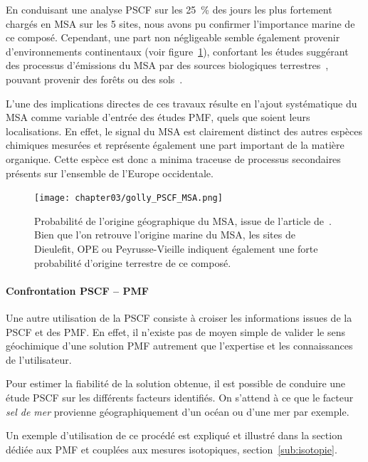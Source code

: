 En conduisant une analyse PSCF sur les \SI{25}{\percent} des jours les plus fortement chargés en MSA
sur les 5 sites, nous avons pu confirmer l'importance marine de ce composé. 
Cependant, une part non négligeable semble également provenir d'environnements
continentaux (voir
figure~\ref{fig:chapter03/golly_PSCF_MSA}), confortant les études suggérant des processus
d'émissions du MSA par des sources biologiques terrestres~\autocite{bozzettiArgon2017},
pouvant provenir des forêts ou des
sols~\autocite{jardineDimethyl2015,miyazakiSeasonal2012}.

L'une des implications directes de ces travaux résulte en l'ajout systématique du MSA
comme variable d'entrée des études PMF, quels que soient leurs localisations. En effet, le
signal du MSA est clairement distinct des autres espèces chimiques mesurées et représente
également une part important de la matière organique. Cette espèce est donc a minima
traceuse de processus secondaires présents sur l'ensemble de l'Europe occidentale.

\begin{figure}[ht!]
    \centering
    \texttt{[image: chapter03/golly\_PSCF\_MSA.png]}
    \caption{Probabilité de l'origine géographique du MSA, issue de l'article
        de~\textcite{gollyOrganic2019}. Bien que l'on retrouve l'origine marine du MSA,
        les sites de Dieulefit, OPE ou Peyrusse-Vieille indiquent également une forte
        probabilité d'origine terrestre de ce composé.}%
    \label{fig:chapter03/golly_PSCF_MSA}
\end{figure}

\paragraph{Confrontation PSCF -- PMF}%
\label{par:confrontation_pscf_pmf}

Une autre utilisation de la PSCF consiste à croiser les informations issues de la PSCF et
des PMF.
En effet, il n'existe pas de moyen simple de valider le sens géochimique d'une solution
PMF autrement que l'expertise et les connaissances de l'utilisateur.

Pour estimer la fiabilité de la solution obtenue, il est possible de conduire une
étude PSCF sur les différents facteurs identifiés. On s'attend à ce que le
facteur \textit{sel de mer} provienne géographiquement d'un océan ou d'une mer par
exemple.

Un exemple d'utilisation de ce procédé est expliqué et illustré dans la section dédiée aux
PMF et couplées aux mesures isotopiques, section~\ref{sub:isotopie}.




